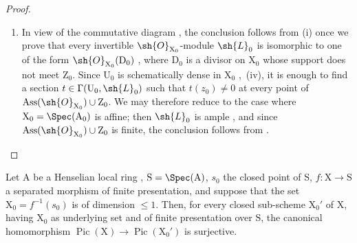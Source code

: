 \begin{proof}
\begin{enumerate}[label=(\roman*)]
The choice of $\mathrm{U}^{(x)}$ therefore defines a divisor $\mathrm{D}'^{(x)}=\operatorname{div}(g^{(x)})$ on $\mathrm{U}^{(x)}$.
We have also seen that $x$ is necessarily isolated in $\mathrm{V}^{(x)}\cap\mathrm{X}_0$; shrinking once more, we may suppose $\mathrm{V}^{(x)}\cap\mathrm{X}_0=\{x\}$.
By condition $2^{\mathrm{o}}$, there is then a subset $\mathrm{W}^{(x)}$ of $\mathrm{V}^{(x)}$, closed in $\mathrm{X}$ and open in $\mathrm{V}^{(x)}$, such that $\mathrm{W}^{(x)}\cap\mathrm{X}_0=\{x\}$.
Replacing $\mathrm{U}^{(x)}$ once more by a smaller open neighbourhood of $x$, we may suppose
$\mathrm{W}^{(x)}=\mathrm{V}^{(x)}$, or in other words that $\mathrm{V}^{(x)}$ is closed in $\mathrm{X}$.
We may now define a divisor $\mathrm{D}^{(x)}$ on $\mathrm{X}$ by requiring $\mathrm{D}^{(x)}|\mathrm{U}^{(x)}=\mathrm{D}'^{(x)}$ and $\mathrm{D}^{(x)}|(\mathrm{X}-\mathrm{V}^{(x)})=0$; this is well defined because on $\mathrm{U}^{(x)}\cap(\mathrm{X}-\mathrm{V}^{(x)})$ the section $g^{(x)}$ is invertible.
It is then enough to take $\mathrm{D}=\sum_{x\in\mathrm{T}}\mathrm{D}^{(x)}$, a meaningful sum since $\mathrm{T}$ is finite.

  \item In view of the commutative diagram , the conclusion follows from (i) once we prove that every invertible $\sh{O}_{\mathrm{X}_0}$-module $\sh{L}_0$ is isomorphic to one of the form $\sh{O}_{\mathrm{X}_0}(\mathrm{D}_0)$ , where $\mathrm{D}_0$ is a divisor on $\mathrm{X}_0$ whose support does not meet $\mathrm{Z}_0$.
Since $\mathrm{U}_0$ is schematically dense in $\mathrm{X}_0$ ,{}~(iv), it is enough  to find a section $t\in\Gamma(\mathrm{U}_0,\sh{L}_0)$ such that $t(z_0)\neq0$ at every point of $\operatorname{Ass}(\sh{O}_{\mathrm{X}_0})\cup\mathrm{Z}_0$.
We may therefore reduce to the case where $\mathrm{X}_0=\Spec(\mathrm{A}_0)$ is affine; then $\sh{L}_0$ is ample , and since $\operatorname{Ass}(\sh{O}_{\mathrm{X}_0})\cup\mathrm{Z}_0$ is finite, the conclusion follows from .
\end{enumerate}
\end{proof}

\begin{corollary}[21.9.12]
\label{IV.21.9.12}
Let $\mathrm{A}$ be a Henselian local ring , $\mathrm{S}=\Spec(\mathrm{A})$, $s_0$ the closed point of $\mathrm{S}$, $f:\mathrm{X}\to\mathrm{S}$ a separated morphism of finite presentation, and suppose that the set $\mathrm{X}_0=f^{-1}(s_0)$ is of dimension $\leq 1$.
Then, for every closed sub-scheme $\mathrm{X}_0'$ of $\mathrm{X}$, having $\mathrm{X}_0$ as underlying set and of finite presentation over $\mathrm{S}$, the canonical homomorphism  $\operatorname{Pic}(\mathrm{X})\to\operatorname{Pic}(\mathrm{X}_0')$ is surjective.
\end{corollary}

